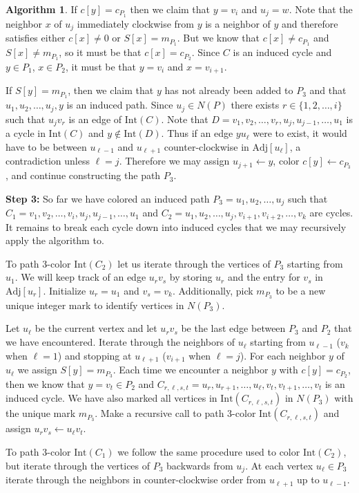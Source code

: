 \documentclass[12pt,letterpaper]{article}
\theoremstyle{plain}
\theoremstyle{definition}
\theoremstyle{break}
\newtheorem{algorithm}[lemma]{Algorithm}     %
\begin{document}
\begin{algorithm}
If $c[y]=c_{P_1}$ then we claim that $y=v_i$ and $u_j=w$. Note that the
neighbor $x$ of $u_j$ immediately clockwise from $y$ is a neighbor of $y$
and therefore satisfies either $c[x]\ne 0$ or $S[x]=m_{P_1}$. But we know
that $c[x]\ne c_{P_1}$ and $S[x]\ne m_{P_1}$, so it must be that
$c[x]=c_{P_2}$. Since $C$ is an induced cycle and $y\in P_1$, $x\in P_2$, it
must be that $y=v_i$ and $x=v_{i+1}$.

If $S[y]=m_{P_1}$, then we claim that $y$ has not already been added to
$P_3$ and that $u_1,u_2,\ldots,u_j,y$ is an induced
path. Since $u_j\in N(P)$ there exists $r\in\{1,2,\ldots,i\}$ such that
$u_jv_r$ is an edge of $\text{Int}(C)$. Note that
$D=v_1,v_2,\ldots,v_r,u_j,u_{j-1},\ldots,u_1$ is a cycle in $\text{Int}(C)$
and $y\not\in\text{Int}(D)$.
Thus if an edge $yu_\ell$ were to exist, it would have to
be between $u_{\ell-1}$ and $u_{\ell+1}$ counter-clockwise in
$\text{Adj}[u_\ell]$, a contradiction
unless $\ell=j$. Therefore we may assign $u_{j+1}\leftarrow y$, color
$c[y]\leftarrow c_{P_3}$, and continue constructing the path $P_3$.

\textbf{Step 3:} So far we have colored an induced path
$P_3=u_1,u_2,\ldots,u_j$ such that
$C_1=v_1,v_2,\ldots,v_i,u_j,u_{j-1},\ldots,u_1$ and
$C_2=u_1,u_2,\ldots,u_j,v_{i+1},v_{i+2},\ldots,v_k$ are cycles. It remains
to break each cycle down into induced cycles that we may recursively
apply the algorithm to.

To path $3$-color $\text{Int}(C_2)$ let us iterate through the vertices of
$P_3$ starting from $u_1$.
We will keep track of an edge $u_rv_s$ by storing $u_r$ and the entry
for $v_s$ in
$\text{Adj}[u_r]$. Initialize $u_r = u_1$ and $v_s=v_k$. Additionally,
pick $m_{P_3}$ to be a new unique integer mark to identify vertices in
$N(P_3)$.

Let $u_\ell$ be the current vertex and let $u_rv_s$ be the last edge
between $P_3$ and $P_2$ that we have encountered. Iterate through the neighbors of $u_\ell$
starting from $u_{\ell-1}$ ($v_k$ when $\ell=1$) and stopping at $u_{\ell+1}$
($v_{i+1}$ when $\ell=j$). For each neighbor $y$ of $u_\ell$ we assign
$S[y]=m_{P_3}$. Each time we encounter a neighbor $y$ with
$c[y]=c_{P_2}$, then we know that $y=v_t\in P_2$ and
$C_{r,\ell,s,t}=u_r,u_{r+1},\ldots,u_\ell,v_t,v_{t+1},\ldots,v_t$ is an induced cycle. We
have also marked all vertices in $\text{Int}(C_{r,\ell,s,t})$ in $N(P_3)$
with the unique mark $m_{P_3}$. Make a recursive call to path $3$-color
$\text{Int}(C_{r,\ell,s,t})$ and assign $u_rv_s\leftarrow u_\ell v_t$.

To path $3$-color $\text{Int}(C_1)$ we follow the same procedure used
to color $\text{Int}(C_2)$, but iterate through the vertices of $P_3$
backwards from $u_j$. At each
vertex $u_\ell\in P_3$ iterate through the neighbors in
counter-clockwise order from $u_{\ell+1}$ up to $u_{\ell - 1}$.
\end{algorithm}
\end{document}
